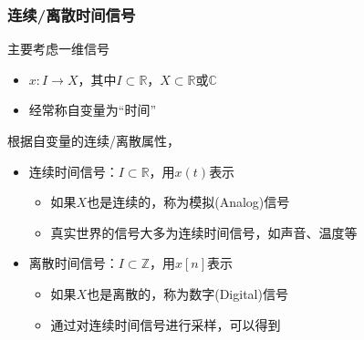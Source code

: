 \documentclass[CJKutf8,xcolor=pdftex,dvipsnames,table]{beamer}
\begin{document}
\begin{CJK*}{UTF8}{song}
  \begin{frame}
    \frametitle{连续/离散时间信号} 
    主要考虑一维信号
    \begin{itemize}
    \item $x: I \to X$，其中$I \subset \mathbb{R}$，$X \subset \mathbb{R}$或$\mathbb{C}$
    \item 经常称自变量为``时间''
    \end{itemize}
    根据自变量的连续/离散属性，
    \begin{itemize}
    \item 连续时间信号：$I \subset \mathbb{R}$，用$x(t)$表示
        \begin{itemize}
        \item 如果$X$也是连续的，称为模拟({\color{red}A}nalog)信号
        \item 真实世界的信号大多为连续时间信号，如声音、温度等
        \end{itemize}
    \item 离散时间信号：$I \subset \mathbb{Z}$，用$x[n]$表示
        \begin{itemize}
        \item 如果$X$也是离散的，称为数字({\color{red}D}igital)信号
        \item 通过对连续时间信号进行采样，可以得到
        \end{itemize}
    \end{itemize}
  \end{frame}


\end{CJK*}
\end{document}
